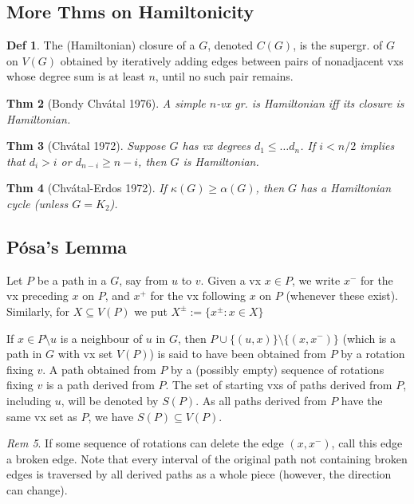 \documentclass[11pt, fleqn, a4paper, landscape]{article}
\theoremstyle{plain} %
\newtheorem{thm}{Thm}
\theoremstyle{remark} %
\newtheorem{rem}[thm]{Rem}
\theoremstyle{definition} %
\newtheorem{defi}[thm]{Def}
\begin{document}
\begin{multicols}{5}
\section{More Thms on Hamiltonicity}
\begin{defi}
The (Hamiltonian) closure of a $G$, denoted $C(G)$, is the supergr. of $G$ on $V (G)$ obtained by iteratively adding edges between pairs of nonadjacent vxs whose degree sum is at least $n$, until no such pair remains.
\end{defi}
\begin{thm}[Bondy Chvátal 1976]
A simple $n$-vx gr. is Hamiltonian iff its closure is Hamiltonian.
\end{thm}
\begin{thm}[Chvátal 1972]
Suppose $G$ has vx degrees $d_1\le \dots d_n$. If $i < n/2$ implies
that $d_i > i$ or $d_{n-i} \ge n - i$, then $G$ is Hamiltonian.
\end{thm}

\begin{thm}[Chvátal-Erdos 1972]
If $\kappa (G)\ge\alpha(G)$, then $G$ has a Hamiltonian cycle (unless
$G = K_2$).
\end{thm}

\subsection{Pósa’s Lemma}
Let $P$ be a path in a $G$, say from $u$ to $v$. Given a vx $x \in P$, we write $x^-$ for the vx preceding $x$ on $P$, and $x^+$ for the vx following $x$ on $P$ (whenever these exist). Similarly, for $X \subseteq V (P)$ we put $X^\pm:=\{x^\pm:x\in X\}$

If $x \in P\setminus u$ is a neighbour of $u$ in $G$, then $P \cup \{(u, x)\}\setminus\{(x, x^-)\}$ (which is a path in $G$ with vx
set $V (P)$) is said to have been obtained from $P$ by a rotation fixing $v$. A path obtained from $P$ by a (possibly empty) sequence of rotations fixing $v$ is a path derived from $P$. The set of starting vxs of paths derived from $P$, including $u$, will be denoted by $S(P)$. As all paths derived from $P$ have the same vx set as $P$, we have $S(P) \subseteq V (P)$.

\begin{rem}
If some sequence of rotations can delete the edge $(x, x^-)$, call this edge a broken edge. Note that every interval of the original path not containing broken edges is traversed by all derived paths as a whole piece (however, the direction can change).
\end{rem}


\end{multicols}
\end{document}
